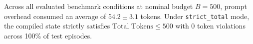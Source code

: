 \documentclass{article}
\begin{document}
Across all evaluated benchmark conditions at nominal budget $B=500$, prompt overhead consumed an average of $54.2 \pm 3.1$ tokens. Under \texttt{strict\_total} mode, the compiled state strictly satisfies $\text{Total Tokens} \leq 500$ with 0 token violations across 100\% of test episodes.

\clearpage

\end{document}
